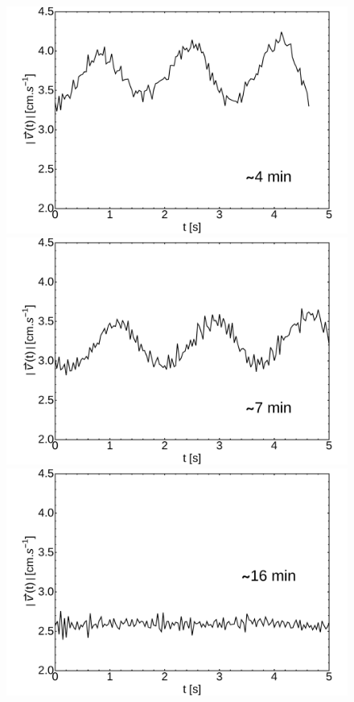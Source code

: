 \documentclass[aps, twocolumn, floatfix, superscriptaddress]{revtex4}
\begin{document}
\begin{figure}[h!]\label{fig:uvst_72dypcm}
    \centering
	\begin{minipage}[c]{0.3\linewidth}
		\centering
		\includegraphics[width=\textwidth]{uvst_72dypcm_a.pdf}
	\end{minipage}
	\begin{minipage}[c]{0.3\linewidth}
		\centering
		\includegraphics[width=\textwidth]{uvst_72dypcm_b.pdf}
	\end{minipage}
	\begin{minipage}[c]{0.3\linewidth}
		\centering
		\includegraphics[width=\textwidth]{uvst_72dypcm_c.pdf}

\end{minipage}
\end{figure}
\end{document}
